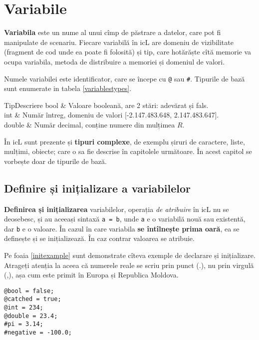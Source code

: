 \section{Variabile}

\textbf{Variabila} este un nume al unui cîmp de păstrare a datelor, care pot fi manipulate de scenariu. Fiecare variabilă în icL are domeniu de vizibilitate (fragment de cod unde ea poate fi folosită) și tip, care hotărăște cîtă memorie va ocupa variabila, metoda de distribuire a memoriei și domeniul de valori.

Numele variabilei este identificator, care se începe cu \lstinline|@| sau {\color{blue2}\lstinline|#|}. Tipurile de bază sunt enumerate in tabela \ref{variablestypes}.

%
{Tip}{Descriere}%
{
	bool   & Valoare booleană, are 2 stări: adevărat și fals. 				  \\ \hline
	int    & Număr întreg, domeniu de valori [-2.147.483.648, 2.147.483.647]. \\ \hline
	double & Număr decimal, conține numere din mulțimea $R$. 				  \\
}

În icL sunt prezente și \textbf{tipuri complexe}, de exemplu șiruri de caractere, liste, mulțimi, obiecte; care o sa fie descrise în capitolele următoare. În acest capitol se vorbește doar de tipurile de bază.

\subsection{Definire și inițializare a variabilelor}

\textbf{Definirea și inițializarea} variabilelor, operația \textit{de atribuire} în icL nu se deosebesc, și au aceeași sintaxă \lstinline`a = b`, unde \lstinline`a` e o variabilă nouă sau existentă, dar \lstinline`b` e o valoare. În cazul în care variabila \textbf{se întîlnește prima oară}, ea se definește și se inițializează. În caz contrar valoarea se atribuie.

Pe foaia \ref{initexample} sunt demonstrate cîteva exemple de declarare și inițializare. Atrageți atenția la aceea că numerele reale se scriu prin punct (.), nu prin virgulă (,), așa cum este primit în Europa și Republica Moldova.

\begin{lstlisting}[caption=Exemplu de declarare și inițializare al variabilelor,label=initexample]
@bool = false;
@catched = true;
@int = 234;
@double = 23.4;
#pi = 3.14;
#negative = -100.0;
\end{lstlisting}


